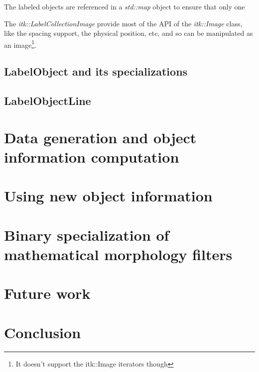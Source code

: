 \documentclass{InsightArticle}
\begin{document}
The labeled objects are referenced in a {\em std::map} object to ensure that only one

The {\em itk::LabelCollectionImage} provide most of the API of the {\em itk::Image} class,
like the spacing support, the physical position, etc, and so can be manipulated as an
image\footnote{It doesn't support the itk::Image iterators though}.

\subsection{LabelObject and its specializations}

\subsection{LabelObjectLine}

\section{Data generation and object information computation}

\section{Using new object information}

\section{Binary specialization of mathematical morphology filters}

\section{Future work}

\section{Conclusion}



\end{document}
